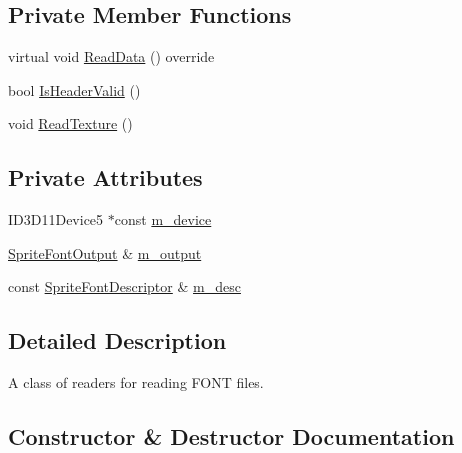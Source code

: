 \subsection*{Private Member Functions}
\begin{DoxyCompactItemize}
\item 
virtual void \hyperlink{classmage_1_1loader_1_1_sprite_font_reader_a9726c5e3ee8692a2e2f4a2c9b4b7adba}{Read\+Data} () override
\item 
bool \hyperlink{classmage_1_1loader_1_1_sprite_font_reader_a6e8d452944d4a87a8e6f89ea6d4212f0}{Is\+Header\+Valid} ()
\item 
void \hyperlink{classmage_1_1loader_1_1_sprite_font_reader_a4c95a43ec8017114981cf9817fd7e4af}{Read\+Texture} ()
\end{DoxyCompactItemize}
\subsection*{Private Attributes}
\begin{DoxyCompactItemize}
\item 
I\+D3\+D11\+Device5 $\ast$const \hyperlink{classmage_1_1loader_1_1_sprite_font_reader_ab4e714ca6e00846db7fb312d03c9ecc2}{m\+\_\+device}
\item 
\hyperlink{structmage_1_1_sprite_font_output}{Sprite\+Font\+Output} \& \hyperlink{classmage_1_1loader_1_1_sprite_font_reader_a818ecabf97163ce3a9b81f67ebfd5799}{m\+\_\+output}
\item 
const \hyperlink{structmage_1_1_sprite_font_descriptor}{Sprite\+Font\+Descriptor} \& \hyperlink{classmage_1_1loader_1_1_sprite_font_reader_adf4502be72787c09c6d4b18566fcb906}{m\+\_\+desc}
\end{DoxyCompactItemize}


\subsection{Detailed Description}
A class of readers for reading F\+O\+NT files. 

\subsection{Constructor \& Destructor Documentation}
\hypertarget{classmage_1_1loader_1_1_sprite_font_reader_aeb66e93ba6fea6590dcb4ddb290d279d}{}\label{classmage_1_1loader_1_1_sprite_font_reader_aeb66e93ba6fea6590dcb4ddb290d279d} 
